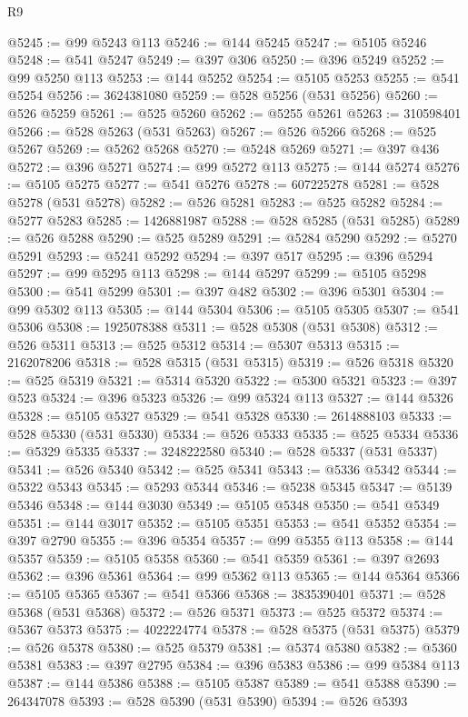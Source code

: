 \begin{lexlean}{R9}
\begin{coremodule}
{{{{{{{{{{{{{{{{{{{{{{{{{{{{{{{{{{{{{{{{{{{{{{{{{{{{{{{{{{{{{{{{{{{{{{{{{{{{{{{{{{{{@5245 := @99 @5243 @113
@5246 := @144 @5245
@5247 := @5105 @5246
@5248 := @541 @5247
@5249 := @397 @306
@5250 := @396 @5249
@5252 := @99 @5250 @113
@5253 := @144 @5252
@5254 := @5105 @5253
@5255 := @541 @5254
@5256 := 3624381080
@5259 := @528 @5256 (@531 @5256)
@5260 := @526 @5259
@5261 := @525 @5260
@5262 := @5255 @5261
@5263 := 310598401
@5266 := @528 @5263 (@531 @5263)
@5267 := @526 @5266
@5268 := @525 @5267
@5269 := @5262 @5268
@5270 := @5248 @5269
@5271 := @397 @436
@5272 := @396 @5271
@5274 := @99 @5272 @113
@5275 := @144 @5274
@5276 := @5105 @5275
@5277 := @541 @5276
@5278 := 607225278
@5281 := @528 @5278 (@531 @5278)
@5282 := @526 @5281
@5283 := @525 @5282
@5284 := @5277 @5283
@5285 := 1426881987
@5288 := @528 @5285 (@531 @5285)
@5289 := @526 @5288
@5290 := @525 @5289
@5291 := @5284 @5290
@5292 := @5270 @5291
@5293 := @5241 @5292
@5294 := @397 @517
@5295 := @396 @5294
@5297 := @99 @5295 @113
@5298 := @144 @5297
@5299 := @5105 @5298
@5300 := @541 @5299
@5301 := @397 @482
@5302 := @396 @5301
@5304 := @99 @5302 @113
@5305 := @144 @5304
@5306 := @5105 @5305
@5307 := @541 @5306
@5308 := 1925078388
@5311 := @528 @5308 (@531 @5308)
@5312 := @526 @5311
@5313 := @525 @5312
@5314 := @5307 @5313
@5315 := 2162078206
@5318 := @528 @5315 (@531 @5315)
@5319 := @526 @5318
@5320 := @525 @5319
@5321 := @5314 @5320
@5322 := @5300 @5321
@5323 := @397 @523
@5324 := @396 @5323
@5326 := @99 @5324 @113
@5327 := @144 @5326
@5328 := @5105 @5327
@5329 := @541 @5328
@5330 := 2614888103
@5333 := @528 @5330 (@531 @5330)
@5334 := @526 @5333
@5335 := @525 @5334
@5336 := @5329 @5335
@5337 := 3248222580
@5340 := @528 @5337 (@531 @5337)
@5341 := @526 @5340
@5342 := @525 @5341
@5343 := @5336 @5342
@5344 := @5322 @5343
@5345 := @5293 @5344
@5346 := @5238 @5345
@5347 := @5139 @5346
@5348 := @144 @3030
@5349 := @5105 @5348
@5350 := @541 @5349
@5351 := @144 @3017
@5352 := @5105 @5351
@5353 := @541 @5352
@5354 := @397 @2790
@5355 := @396 @5354
@5357 := @99 @5355 @113
@5358 := @144 @5357
@5359 := @5105 @5358
@5360 := @541 @5359
@5361 := @397 @2693
@5362 := @396 @5361
@5364 := @99 @5362 @113
@5365 := @144 @5364
@5366 := @5105 @5365
@5367 := @541 @5366
@5368 := 3835390401
@5371 := @528 @5368 (@531 @5368)
@5372 := @526 @5371
@5373 := @525 @5372
@5374 := @5367 @5373
@5375 := 4022224774
@5378 := @528 @5375 (@531 @5375)
@5379 := @526 @5378
@5380 := @525 @5379
@5381 := @5374 @5380
@5382 := @5360 @5381
@5383 := @397 @2795
@5384 := @396 @5383
@5386 := @99 @5384 @113
@5387 := @144 @5386
@5388 := @5105 @5387
@5389 := @541 @5388
@5390 := 264347078
@5393 := @528 @5390 (@531 @5390)
@5394 := @526 @5393
}}}}}}}}}}}}}}}}}}}}}}}}}}}}}}}}}}}}}}}}}}}}}}}}}}}}}}}}}}}}}}}}}}}}}}}}}}}}}}}}}}}}
\end{coremodule}
\end{lexlean}

